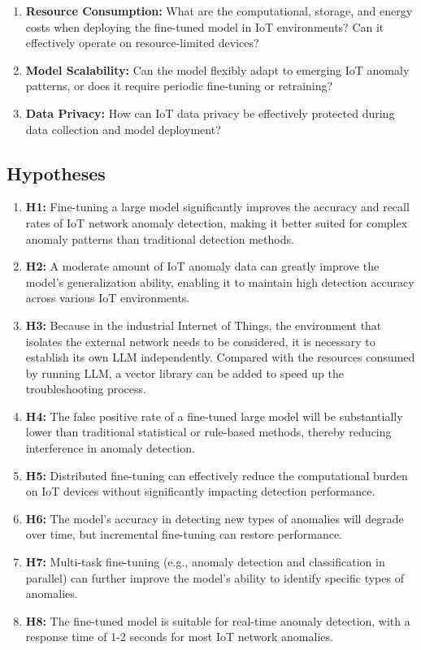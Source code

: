 \documentclass[12pt]{article}
\begin{document}
\begin{enumerate}[label=\arabic*.]
  \item \textbf{Resource Consumption:} What are the computational, storage, and energy costs when deploying the fine-tuned model in IoT environments? Can it effectively operate on resource-limited devices?
  
  \item \textbf{Model Scalability:} Can the model flexibly adapt to emerging IoT anomaly patterns, or does it require periodic fine-tuning or retraining?
  
  \item \textbf{Data Privacy:} How can IoT data privacy be effectively protected during data collection and model deployment?
\end{enumerate}

\subsection{Hypotheses}
\begin{enumerate}[label=\arabic*.]
  \item \textbf{H1:} Fine-tuning a large model significantly improves the accuracy and recall rates of IoT network anomaly detection, making it better suited for complex anomaly patterns than traditional detection methods.
  
  \item \textbf{H2:} A moderate amount of IoT anomaly data can greatly improve the model's generalization ability, enabling it to maintain high detection accuracy across various IoT environments.
  
  \item \textbf{H3:} Because in the industrial Internet of Things, the environment that isolates the external network needs to be considered, it is necessary to establish its own LLM independently. Compared with the resources consumed by running LLM, a vector library can be added to speed up the troubleshooting process.

  \item \textbf{H4:} The false positive rate of a fine-tuned large model will be substantially lower than traditional statistical or rule-based methods, thereby reducing interference in anomaly detection.
  
  \item \textbf{H5:} Distributed fine-tuning can effectively reduce the computational burden on IoT devices without significantly impacting detection performance.
  
  \item \textbf{H6:} The model’s accuracy in detecting new types of anomalies will degrade over time, but incremental fine-tuning can restore performance.
  
  \item \textbf{H7:} Multi-task fine-tuning (e.g., anomaly detection and classification in parallel) can further improve the model’s ability to identify specific types of anomalies.
  
  \item \textbf{H8:} The fine-tuned model is suitable for real-time anomaly detection, with a response time of 1-2 seconds for most IoT network anomalies.
\end{enumerate}
\end{document}
